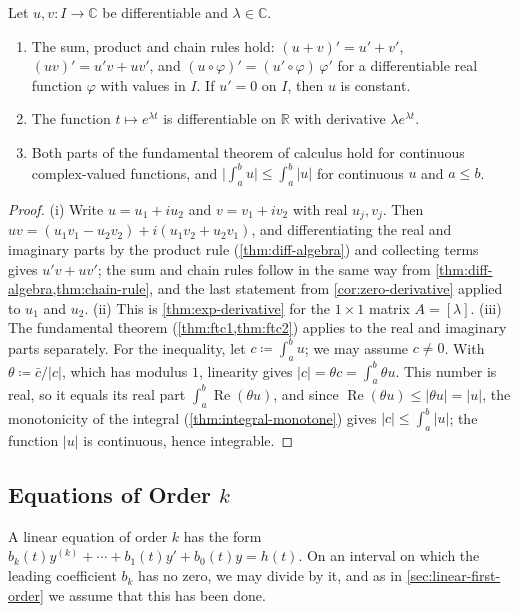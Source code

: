 \begin{lemma}
\label{lem:complex-calculus}
Let $u,v\colon I\to\mathbb C$ be differentiable and $\lambda\in\mathbb C$.
\begin{enumerate}
\item The sum, product and chain rules hold: $(u+v)'=u'+v'$, $(uv)'=u'v+uv'$, and $(u\circ\varphi)'=(u'\circ\varphi)\,\varphi'$ for a differentiable real function $\varphi$ with values in $I$. If $u'=0$ on $I$, then $u$ is constant.
\item The function $t\mapsto e^{\lambda t}$ is differentiable on $\mathbb R$ with derivative $\lambda e^{\lambda t}$.
\item Both parts of the fundamental theorem of calculus hold for continuous complex-valued functions, and $\bigl|\int_a^bu\bigr|\le\int_a^b|u|$ for continuous $u$ and $a\le b$.
\end{enumerate}
\end{lemma}

\begin{proof}
(i) Write $u=u_1+iu_2$ and $v=v_1+iv_2$ with real $u_j,v_j$. Then $uv=(u_1v_1-u_2v_2)+i(u_1v_2+u_2v_1)$, and differentiating the real and imaginary parts by the product rule (\cref{thm:diff-algebra}) and collecting terms gives $u'v+uv'$; the sum and chain rules follow in the same way from \cref{thm:diff-algebra,thm:chain-rule}, and the last statement from \cref{cor:zero-derivative} applied to $u_1$ and $u_2$. (ii) This is \cref{thm:exp-derivative} for the $1\times1$ matrix $A=[\lambda]$. (iii) The fundamental theorem (\cref{thm:ftc1,thm:ftc2}) applies to the real and imaginary parts separately. For the inequality, let $c\coloneqq\int_a^bu$; we may assume $c\ne0$. With $\theta\coloneqq\bar c/|c|$, which has modulus $1$, linearity gives $|c|=\theta c=\int_a^b\theta u$. This number is real, so it equals its real part $\int_a^b\operatorname{Re}(\theta u)$, and since $\operatorname{Re}(\theta u)\le|\theta u|=|u|$, the monotonicity of the integral (\cref{thm:integral-monotone}) gives $|c|\le\int_a^b|u|$; the function $|u|$ is continuous, hence integrable.
\end{proof}

\subsection{Equations of Order \texorpdfstring{$k$}{k}}

A linear equation of order $k$ has the form $b_k(t)y^{(k)}+\cdots+b_1(t)y'+b_0(t)y=h(t)$. On an interval on which the leading coefficient $b_k$ has no zero, we may divide by it, and as in \cref{sec:linear-first-order} we assume that this has been done.

